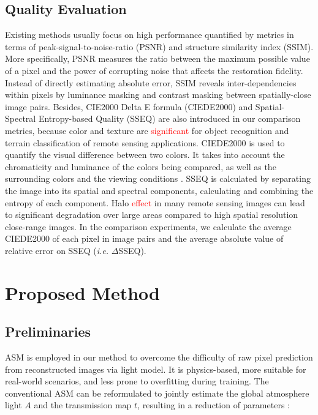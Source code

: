 \documentclass[lettersize,journal]{IEEEtran}
\begin{document}
\subsection{Quality Evaluation}
\label{subsec:2.3}
Existing methods usually focus on high performance quantified by metrics in terms of peak-signal-to-noise-ratio (PSNR) and structure similarity index (SSIM). More specifically, PSNR measures the ratio between the maximum possible value of a pixel and the power of corrupting noise that affects the restoration fidelity. Instead of directly estimating absolute error, SSIM reveals inter-dependencies within pixels by luminance masking and contrast masking between spatially-close image pairs. Besides, CIE2000 Delta E formula (CIEDE2000) and Spatial-Spectral Entropy-based Quality (SSEQ) are also introduced in our comparison metrics, because color and texture are \textcolor{red}{significant} for object recognition and terrain classification of remote sensing applications. CIEDE2000 is used to quantify the visual difference between two colors. It takes into account the chromaticity and luminance of the colors being compared, as well as the surrounding colors and the viewing conditions \cite{luo2001ciede2000}. SSEQ is calculated by separating the image into its spatial and spectral components, calculating and combining the entropy of each component\cite{liu2014sseq}. Halo \textcolor{red}{effect} in many remote sensing images can lead to significant degradation over large areas compared to high spatial resolution close-range images. In the comparison experiments, we calculate the average CIEDE2000 of each pixel in image pairs and the average absolute value of relative error on SSEQ (\textit{i.e.} $\Delta$SSEQ). 

\section{Proposed Method}
\subsection{Preliminaries}
ASM is employed in our method to overcome the difficulty of raw pixel prediction from reconstructed images via light model. It is physics-based, more suitable for real-world scenarios, and less prone to overfitting during training. The conventional ASM can be reformulated to jointly estimate the global atmosphere light $A$ and the transmission map $t$, resulting in a reduction of parameters \cite{li2017aod}:
\end{document}
